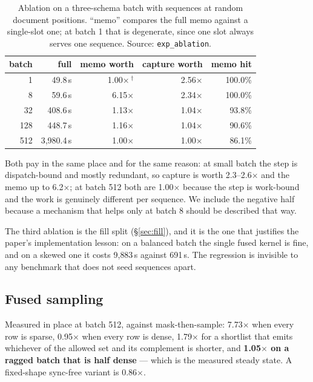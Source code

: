 \documentclass{article}
\begin{document}
\begin{table}[t]
\caption{Ablation on a three-schema batch with sequences at random document
positions. ``memo'' compares the full memo against a single-slot one; at batch
1 that is degenerate, since one slot always serves one sequence.
Source: \texttt{exp\_ablation}.}
\label{tab:ablation}
\vskip 0.1in
\begin{center}
\begin{small}
\begin{tabular}{rrrrr}
\toprule
batch & full & memo worth & capture worth & memo hit \\
\midrule
1   & 49.8\,\textmu{}s    & 1.00$\times$\,$^\dagger$ & 2.56$\times$ & 100.0\% \\
8   & 59.6\,\textmu{}s    & 6.15$\times$ & 2.34$\times$ & 100.0\% \\
32  & 408.6\,\textmu{}s   & 1.13$\times$ & 1.04$\times$ & 93.8\% \\
128 & 448.7\,\textmu{}s   & 1.16$\times$ & 1.04$\times$ & 90.6\% \\
512 & 3{,}980.4\,\textmu{}s & 1.00$\times$ & 1.00$\times$ & 86.1\% \\
\bottomrule
\end{tabular}
\end{small}
\end{center}
\vskip -0.1in
\end{table}

Both pay in the same place and for the same reason: at small batch the step is
dispatch-bound and mostly redundant, so capture is worth 2.3--2.6$\times$ and
the memo up to 6.2$\times$; at batch 512 both are 1.00$\times$ because the step
is work-bound and the work is genuinely different per sequence. We include the
negative half because a mechanism that helps only at batch 8 should be described
that way.

The third ablation is the fill split (\S\ref{sec:fill}), and it is the one that
justifies the paper's implementation lesson: on a balanced batch the single
fused kernel is fine, and on a skewed one it costs 9{,}883\,\textmu{}s against
691\,\textmu{}s. The regression is invisible to any benchmark that does not
seed sequences apart.

\subsection{Fused sampling}
\label{sec:eval-sampling}

Measured in place at batch 512, against mask-then-sample: 7.73$\times$ when
every row is sparse, 0.95$\times$ when every row is dense, 1.79$\times$ for a
shortlist that emits whichever of the allowed set and its complement is shorter,
and \textbf{1.05$\times$ on a ragged batch that is half dense} --- which is the
measured steady state. A fixed-shape sync-free variant is 0.86$\times$.
\end{document}
